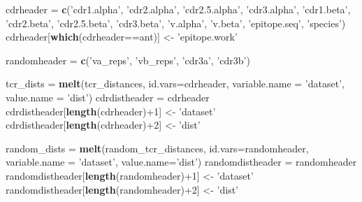 \documentclass[]{article}
\newenvironment{Shaded}{\begin{snugshade}}{\end{snugshade}}
\newcommand{\KeywordTok}[1]{\textcolor[rgb]{0.13,0.29,0.53}{\textbf{{#1}}}}
\newcommand{\DataTypeTok}[1]{\textcolor[rgb]{0.13,0.29,0.53}{{#1}}}
\newcommand{\DecValTok}[1]{\textcolor[rgb]{0.00,0.00,0.81}{{#1}}}
\newcommand{\StringTok}[1]{\textcolor[rgb]{0.31,0.60,0.02}{{#1}}}
\newcommand{\NormalTok}[1]{{#1}}
\begin{document}
\begin{Shaded}
\begin{Highlighting}[]
\NormalTok{cdrheader =}\StringTok{ }\KeywordTok{c}\NormalTok{(}\StringTok{'cdr1.alpha'}\NormalTok{, }\StringTok{'cdr2.alpha'}\NormalTok{, }\StringTok{'cdr2.5.alpha'}\NormalTok{, }\StringTok{'cdr3.alpha'}\NormalTok{, }
            \StringTok{'cdr1.beta'}\NormalTok{, }\StringTok{'cdr2.beta'}\NormalTok{, }\StringTok{'cdr2.5.beta'}\NormalTok{, }\StringTok{'cdr3.beta'}\NormalTok{, }
            \StringTok{'v.alpha'}\NormalTok{, }\StringTok{'v.beta'}\NormalTok{, }\StringTok{'epitope.seq'}\NormalTok{, }\StringTok{'species'}\NormalTok{)}
\NormalTok{cdrheader[}\KeywordTok{which}\NormalTok{(cdrheader==ant)] <-}\StringTok{ 'epitope.work'}

\NormalTok{randomheader =}\StringTok{ }\KeywordTok{c}\NormalTok{(}\StringTok{'va_reps'}\NormalTok{, }\StringTok{'vb_reps'}\NormalTok{, }\StringTok{'cdr3a'}\NormalTok{, }\StringTok{'cdr3b'}\NormalTok{)}
\end{Highlighting}
\end{Shaded}

\begin{Shaded}
\begin{Highlighting}[]
\NormalTok{tcr_dists =}\StringTok{ }\KeywordTok{melt}\NormalTok{(tcr_distances, }\DataTypeTok{id.vars=}\NormalTok{cdrheader, }\DataTypeTok{variable.name =} \StringTok{'dataset'}\NormalTok{, }\DataTypeTok{value.name =} \StringTok{'dist'}\NormalTok{)}
\NormalTok{cdrdistheader =}\StringTok{ }\NormalTok{cdrheader}
\NormalTok{cdrdistheader[}\KeywordTok{length}\NormalTok{(cdrheader)+}\DecValTok{1}\NormalTok{] <-}\StringTok{ 'dataset'}
\NormalTok{cdrdistheader[}\KeywordTok{length}\NormalTok{(cdrheader)+}\DecValTok{2}\NormalTok{] <-}\StringTok{ 'dist'}

\NormalTok{random_dists =}\StringTok{ }\KeywordTok{melt}\NormalTok{(random_tcr_distances, }\DataTypeTok{id.vars=}\NormalTok{randomheader, }\DataTypeTok{variable.name =} \StringTok{'dataset'}\NormalTok{, }\DataTypeTok{value.name=}\StringTok{'dist'}\NormalTok{)}
\NormalTok{randomdistheader =}\StringTok{ }\NormalTok{randomheader}
\NormalTok{randomdistheader[}\KeywordTok{length}\NormalTok{(randomheader)+}\DecValTok{1}\NormalTok{] <-}\StringTok{ 'dataset'}
\NormalTok{randomdistheader[}\KeywordTok{length}\NormalTok{(randomheader)+}\DecValTok{2}\NormalTok{] <-}\StringTok{ 'dist'}
\end{Highlighting}
\end{Shaded}
\end{document}
